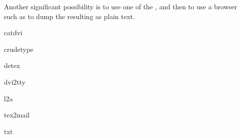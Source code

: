 Another significant possibility is to use one of the
,
and then to use a browser such as  to dump the resulting
 as plain text.
\begin{ctanrefs}
\item[catdvi]
\item[crudetype]
\item[detex]
\item[dvi2tty]
\item[l2a]
\item[tex2mail]
\item[txt]
\end{ctanrefs}


